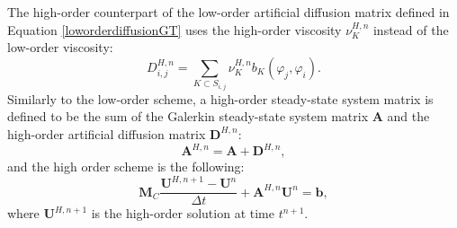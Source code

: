 The high-order counterpart of the low-order artificial diffusion matrix defined
in Equation \eqref{loworderdiffusionGT} uses the high-order viscosity $\nu_K^{H,n}$
instead of the low-order viscosity:
\begin{equation}
   D^{H,n}_{i,j} = \sum\limits_{K\subset S_{i,j}}\nu_K^{H,n} b_K(\varphi_j,\varphi_i).
\end{equation}
Similarly to the low-order scheme, a high-order steady-state system matrix is
defined to be the sum of the Galerkin steady-state system matrix $\mathbf{A}$ and the
high-order artificial diffusion matrix $\mathbf{D}^{H,n}$:
\begin{equation}
   \mathbf{A}^{H,n} = \mathbf{A} + \mathbf{D}^{H,n},
\end{equation}
and the high order scheme is the following:
\begin{equation}\label{gthighorderscheme}
   \mathbf{M}_C\frac{\mathbf{U}^{H,n+1}-\mathbf{U}^n}{\Delta t}
      +\mathbf{A}^{H,n}\mathbf{U}^n = \mathbf{b},
\end{equation}
where $\mathbf{U}^{H,n+1}$ is the high-order solution at time $t^{n+1}$.

